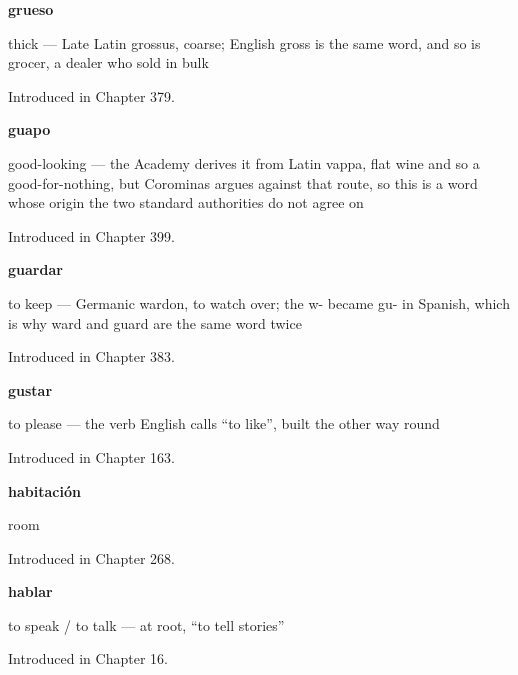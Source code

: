 \noindent\begin{minipage}[t]{\linewidth}
\raggedright
\textbf{grueso}\par
\small thick — Late Latin grossus, coarse; English gross is the same word, and so is grocer, a dealer who sold in bulk\par
\footnotesize Introduced in Chapter 379.
\end{minipage}\par\medskip

\noindent\begin{minipage}[t]{\linewidth}
\raggedright
\textbf{guapo}\par
\small good-looking — the Academy derives it from Latin vappa, flat wine and so a good-for-nothing, but Corominas argues against that route, so this is a word whose origin the two standard authorities do not agree on\par
\footnotesize Introduced in Chapter 399.
\end{minipage}\par\medskip

\noindent\begin{minipage}[t]{\linewidth}
\raggedright
\textbf{guardar}\par
\small to keep — Germanic wardon, to watch over; the w- became gu- in Spanish, which is why ward and guard are the same word twice\par
\footnotesize Introduced in Chapter 383.
\end{minipage}\par\medskip

\noindent\begin{minipage}[t]{\linewidth}
\raggedright
\textbf{gustar}\par
\small to please — the verb English calls \textquotedblleft{}to like\textquotedblright{}, built the other way round\par
\footnotesize Introduced in Chapter 163.
\end{minipage}\par\medskip

\noindent\begin{minipage}[t]{\linewidth}
\raggedright
\textbf{habitación}\par
\small room\par
\footnotesize Introduced in Chapter 268.
\end{minipage}\par\medskip

\noindent\begin{minipage}[t]{\linewidth}
\raggedright
\textbf{hablar}\par
\small to speak / to talk — at root, \textquotedblleft{}to tell stories\textquotedblright{}\par
\footnotesize Introduced in Chapter 16.
\end{minipage}\par\medskip

